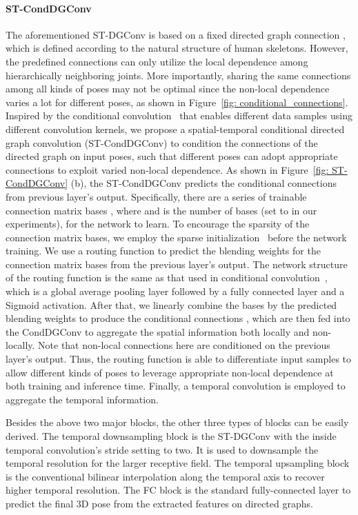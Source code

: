 \documentclass[sigconf]{acmart}
\begin{document}
\paragraph{ST-CondDGConv}
The aforementioned ST-DGConv is based on a fixed directed graph connection ,
which is defined according to the natural structure of human skeletons.
However, the predefined connections can only utilize the local dependence among hierarchically neighboring joints.
More importantly, sharing the same connections among all kinds of poses may not be optimal since the non-local dependence varies a lot for different poses, as shown in Figure~\ref{fig: conditional_connections}.
Inspired by the conditional convolution~\cite{NEURIPS2019_f2201f51,tian2020conditional} that enables different data samples using different convolution kernels, we propose a spatial-temporal conditional directed graph convolution (ST-CondDGConv) to condition the connections of the directed graph on input poses, such that different poses can adopt appropriate connections to exploit varied non-local dependence.
As shown in Figure~\ref{fig: ST-CondDGConv} (b), the ST-CondDGConv predicts the conditional connections  from previous layer's output. 
Specifically, there are a series of trainable connection matrix bases , where  and  is the number of bases (set to  in our experiments), for the network to learn.
To encourage the sparsity of the connection matrix bases, we employ the sparse initialization~\cite{martens2010deep} before the network training.  
We use a routing function to predict the blending weights for the connection matrix bases from the previous layer's output.
The network structure of the routing function is the same as that used in conditional convolution~\cite{NEURIPS2019_f2201f51}, which is a global average pooling layer followed by a fully connected layer and a Sigmoid activation.
After that, we linearly combine the bases by the predicted blending weights to produce the conditional connections , which are then fed into the CondDGConv to aggregate the spatial information both locally and non-locally.
Note that non-local connections here are conditioned on the previous layer's output.
Thus, the routing function is able to differentiate input samples to allow different kinds of poses to leverage appropriate non-local dependence at both training and inference time.
Finally, a temporal convolution is employed to aggregate the temporal information.


Besides the above two major blocks, the other three types of blocks can be easily derived.
The temporal downsampling block is the ST-DGConv with the inside temporal convolution's stride setting to two.
It is used to downsample the temporal resolution for the larger receptive field.
The temporal upsampling block is the conventional bilinear interpolation along the temporal axis to recover higher temporal resolution.
The FC block is the standard fully-connected layer to predict the final 3D pose from the extracted features on directed graphs.
\end{document}
